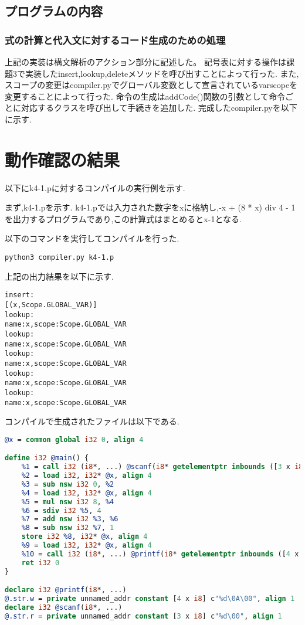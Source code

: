\documentclass[main]{subfiles}
\begin{document}
\subsection{プログラムの内容}
\subsubsection{式の計算と代入文に対するコード生成のための処理}
上記の実装は構文解析のアクション部分に記述した。
記号表に対する操作は課題3で実装したinsert,lookup,deleteメソッドを呼び出すことによって行った.
また,スコープの変更はcompiler.pyでグローバル変数として宣言されているvarscopeを変更することによって行った.
命令の生成はaddCode()関数の引数として命令ごとに対応するクラスを呼び出して手続きを追加した.
完成したcompiler.pyを以下に示す.


\section{動作確認の結果}
以下にk4-1.pに対するコンパイルの実行例を示す.

まず,k4-1.pを示す.
k4-1.pでは入力された数字をxに格納し,-x + (8 * x) div 4 - 1を出力するプログラムであり,この計算式はまとめるとx-1となる.

以下のコマンドを実行してコンパイルを行った.
\begin{oframed}
\begin{verbatim}
python3 compiler.py k4-1.p
\end{verbatim}
\end{oframed}
上記の出力結果を以下に示す.
\begin{lstlisting}[caption=python3 compiler.py k4-1.pの出力]
insert:
[(x,Scope.GLOBAL_VAR)]
lookup:
name:x,scope:Scope.GLOBAL_VAR
lookup:
name:x,scope:Scope.GLOBAL_VAR
lookup:
name:x,scope:Scope.GLOBAL_VAR
lookup:
name:x,scope:Scope.GLOBAL_VAR
lookup:
name:x,scope:Scope.GLOBAL_VAR
\end{lstlisting}
コンパイルで生成されたファイルは以下である.
\begin{lstlisting}[caption=k4-1.pのコンパイルで生成されたresult.ll,language=LLVM]
@x = common global i32 0, align 4

define i32 @main() {
    %1 = call i32 (i8*, ...) @scanf(i8* getelementptr inbounds ([3 x i8], [3 x i8]* @.str.r, i64 0, i64 0), i32* @x)
    %2 = load i32, i32* @x, align 4
    %3 = sub nsw i32 0, %2
    %4 = load i32, i32* @x, align 4
    %5 = mul nsw i32 8, %4
    %6 = sdiv i32 %5, 4
    %7 = add nsw i32 %3, %6
    %8 = sub nsw i32 %7, 1
    store i32 %8, i32* @x, align 4
    %9 = load i32, i32* @x, align 4
    %10 = call i32 (i8*, ...) @printf(i8* getelementptr inbounds ([4 x i8], [4 x i8]* @.str.w, i64 0, i64 0), i32 %9)
    ret i32 0
}

declare i32 @printf(i8*, ...)
@.str.w = private unnamed_addr constant [4 x i8] c"%d\0A\00", align 1
declare i32 @scanf(i8*, ...)
@.str.r = private unnamed_addr constant [3 x i8] c"%d\00", align 1
\end{lstlisting}
\end{document}
